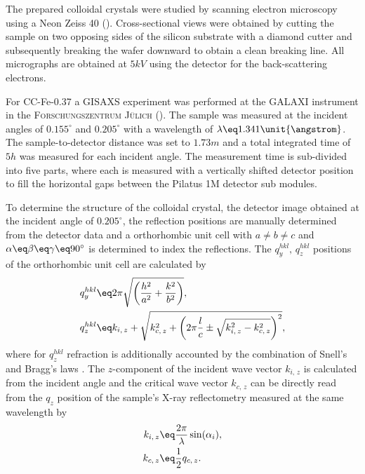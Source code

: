 \documentclass[\main/dresen_thesis.tex]{subfiles}
\begin{document}
    The prepared colloidal crystals were studied by scanning electron microscopy using a Neon Zeiss 40 ().
    Cross-sectional views were obtained by cutting the sample on two opposing sides of the silicon substrate with a diamond cutter and subsequently breaking the wafer downward to obtain a clean breaking line.
    All micrographs are obtained at $5 \unit{kV}$ using the detector for the back-scattering electrons.

    For CC-Fe-0.37 a GISAXS experiment was performed at the GALAXI instrument in the \textsc{Forschungszentrum J\"ulich} ().
    The sample was measured at the incident angles of $0.155 ^\circ$ and $0.205 ^\circ$ with a wavelength of $\lambda \eq 1.341 \unit{\angstrom}$.
    The sample-to-detector distance was set to $1.73 \unit{m}$ and a total integrated time of $5 \unit{h}$ was measured for each incident angle.
    The measurement time is sub-divided into five parts, where each is measured with a vertically shifted detector position to fill the horizontal gaps between the Pilatus 1M detector sub modules.

    To determine the structure of the colloidal crystal, the detector image obtained at the incident angle of $0.205 ^\circ$, the reflection positions are manually determined from the detector data and a orthorhombic unit cell with $a \neq b \neq c$ and $\alpha \eq \beta \eq \gamma \eq 90 ^\circ$ is determined to index the reflections.
    The $q^{hkl}_y, \, q^{hkl}_z$ positions of the orthorhombic unit cell are calculated by
    \begin{align}
      \begin{split}
        \label{eq:colloidalCrystals:layerChar:gisaxs:reflexPosition}
        q^{hkl}_y \eq& 2 \pi \sqrt{\biggl( \frac{h^2}{a^2} + \frac{k^2}{b^2} \biggr)},\\
        q^{hkl}_z \eq& k_{i,\, z} + \sqrt{k_{c,\, z}^2 + \biggl( 2\pi \frac{l}{c} \pm \sqrt{k_{i,\, z}^2 - k_{c,\, z}^2} \biggr)^2},
      \end{split}
    \end{align}
    where for $q^{hkl}_z$ refraction is additionally accounted by the combination of Snell's and Bragg's laws \cite{Disch_2011_Shape}.
    The $z$-component of the incident wave vector $k_{i,\, z}$ is calculated from the incident angle and the critical wave vector $k_{c,\, z}$ can be directly read from the $q_z$ position of the sample's X-ray reflectometry measured at the same wavelength by
    \begin{align}
      \begin{split}
        k_{i,\, z} \eq& \frac{2 \pi}{\lambda} \sin(\alpha_i),\\
        k_{c,\, z} \eq& \frac{1}{2} q_{c,\,z}.
      \end{split}
    \end{align}
\end{document}
